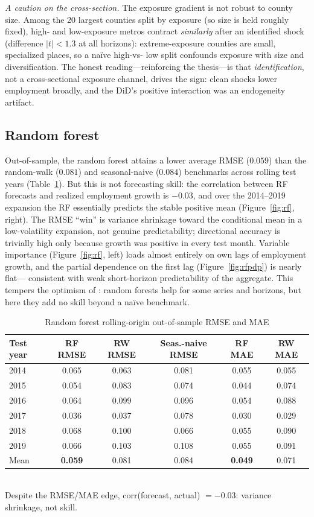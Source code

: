 \documentclass[11pt]{article}
\begin{document}
\emph{A caution on the cross-section.} The exposure gradient is not robust to county size.
Among the 20 largest counties split by exposure (so size is held roughly fixed), high- and
low-exposure metros contract \emph{similarly} after an identified shock (difference $|t|<1.3$
at all horizons): extreme-exposure counties are small, specialized places, so a na\"ive high-vs-
low split confounds exposure with size and diversification. The honest reading---reinforcing the
thesis---is that \emph{identification}, not a cross-sectional exposure channel, drives the sign:
clean shocks lower employment broadly, and the DiD's positive interaction was an endogeneity
artifact.

\subsection{Random forest}
Out-of-sample, the random forest attains a lower average RMSE ($0.059$) than the random-walk
($0.081$) and seasonal-naive ($0.084$) benchmarks across rolling test years
(Table~\ref{tab:rfcv}). But this is not forecasting skill: the correlation between RF forecasts
and realized employment growth is $-0.03$, and over the 2014--2019 expansion the RF essentially
predicts the stable positive mean (Figure~\ref{fig:rf}, right). The RMSE ``win'' is variance
shrinkage toward the conditional mean in a low-volatility expansion, not genuine predictability;
directional accuracy is trivially high only because growth was positive in every test month.
Variable importance (Figure~\ref{fig:rf}, left) loads almost entirely on own lags of employment
growth, and the partial dependence on the first lag (Figure~\ref{fig:rfpdp}) is nearly flat---
consistent with weak short-horizon predictability of the aggregate. This tempers the optimism of
\citet{medeiros2021}: random forests help for some series and horizons, but here they add no skill
beyond a na\"ive benchmark.

\begin{table}[H]\centering
\caption{Random forest rolling-origin out-of-sample RMSE and MAE}\label{tab:rfcv}\small
\begin{tabular}{lccccc}
\toprule
Test year & RF RMSE & RW RMSE & Seas.-naive RMSE & RF MAE & RW MAE \\
\midrule
2014 & 0.065 & 0.063 & 0.081 & 0.055 & 0.055 \\
2015 & 0.054 & 0.083 & 0.074 & 0.044 & 0.074 \\
2016 & 0.064 & 0.099 & 0.096 & 0.054 & 0.088 \\
2017 & 0.036 & 0.037 & 0.078 & 0.030 & 0.029 \\
2018 & 0.068 & 0.100 & 0.066 & 0.055 & 0.090 \\
2019 & 0.066 & 0.103 & 0.108 & 0.055 & 0.091 \\
\midrule
Mean & \textbf{0.059} & 0.081 & 0.084 & \textbf{0.049} & 0.071 \\
\bottomrule
\end{tabular}
\\[2pt]
\footnotesize Despite the RMSE/MAE edge, corr(forecast, actual) $=-0.03$: variance shrinkage, not skill.
\end{table}
\end{document}
